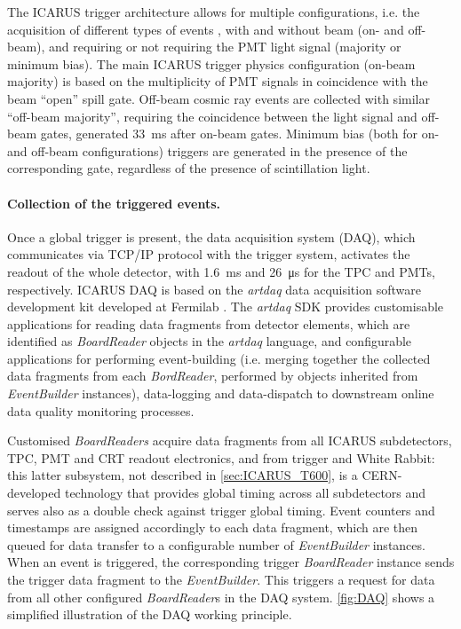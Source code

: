 The ICARUS trigger architecture allows for multiple configurations, i.e. the acquisition of different types of events \cite{ICARUS:2025kai}, with and without beam (on- and off-beam), and requiring or not requiring the PMT light signal (majority or minimum bias). The main ICARUS trigger physics configuration (on-beam majority) is based on the multiplicity of PMT signals in coincidence with the beam ``open'' spill gate. Off-beam cosmic ray events are collected with similar ``off-beam majority'', requiring the coincidence between the light signal and off-beam gates, generated \SI{33}{\ms} after on-beam gates. Minimum bias (both for on- and off-beam configurations) triggers are generated in the presence of the corresponding gate, regardless of the presence of scintillation light.

\paragraph{Collection of the triggered events. } Once a global trigger is present, the data acquisition system (DAQ), which communicates via TCP/IP protocol with the trigger system, activates the readout of the whole detector, with \SI{1.6}{\ms} and \SI{26}{\us} for the TPC and PMTs, respectively. ICARUS DAQ is based on the \emph{artdaq} data acquisition software development kit developed at Fermilab \cite{Biery:2013cda}. The \emph{artdaq} SDK provides  customisable applications for reading data fragments from detector elements, which are identified as \emph{BoardReader} objects in the \emph{artdaq} language, and configurable applications for performing event-building (i.e. merging together the collected data fragments from each \emph{BordReader}, performed by objects inherited from \emph{EventBuilder} instances), data-logging and data-dispatch to downstream online data quality monitoring processes. 

Customised \emph{BoardReaders} acquire data fragments from all ICARUS subdetectors, TPC, PMT and CRT readout electronics, and from trigger and White Rabbit: this latter subsystem, not described in \autoref{sec:ICARUS_T600}, is a CERN-developed technology that provides global timing across all subdetectors and serves also as a double check against trigger global timing. Event counters and timestamps are assigned accordingly to each data fragment, which are then queued for data transfer to a configurable number of \emph{EventBuilder} instances. When an event is triggered, the corresponding trigger \emph{BoardReader} instance sends the trigger data fragment to the \emph{EventBuilder}. This triggers a request for data from all other configured \emph{BoardReader}s in the DAQ system. \autoref{fig:DAQ} shows a simplified illustration of the DAQ working principle. 

